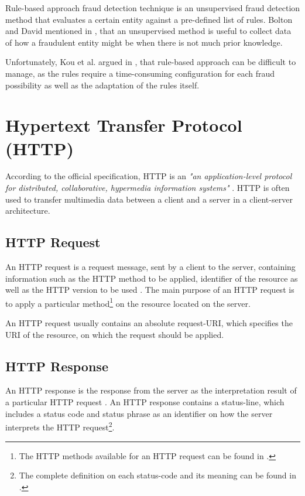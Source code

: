       Rule-based approach fraud detection technique is an unsupervised fraud detection method that evaluates a certain entity against a pre-defined list of rules. Bolton and David mentioned in \autocite{statistical-fds}, that an unsupervised method is useful to collect data of how a fraudulent entity might be when there is not much prior knowledge.

      Unfortunately, Kou et al. argued in \autocite{1297040}, that rule-based approach can be difficult to manage, as the rules require a time-consuming configuration for each fraud possibility as well as the adaptation of the rules itself. 

  \section{Hypertext Transfer Protocol (HTTP)}
  
    According to the official specification, HTTP is an \emph{"an application-level protocol for distributed, collaborative, hypermedia information systems"} \autocite{http-rfc}. HTTP is often used to transfer multimedia data between a client and a server in a client-server architecture. 
    
    \subsection{HTTP Request}

      An HTTP request is a request message, sent by a client to the server, containing information such as the HTTP method to be applied, identifier of the resource as well as the HTTP version to be used \autocite[\enquote{5 Request}]{http-rfc}. The main purpose of an HTTP request is to apply a particular method\footnote{The HTTP methods available for an HTTP request can be found in \autocite[\enquote{5.1.1 Method}]{http-rfc}.} on the resource located on the server. 
      
      An HTTP request usually contains an absolute request-URI, which specifies the URI of the resource, on which the request should be applied.  

    \subsection{HTTP Response}

      An HTTP response is the response from the server as the interpretation result of a particular HTTP request \autocite[6 Response]{http-rfc}. An HTTP response contains a status-line, which includes a status code and status phrase as an identifier on how the server interprets the HTTP request\footnote{The complete definition on each status-code and its meaning can be found in \autocite[\enquote{10 Status Code Definitions}]{http-rfc}.}. 

